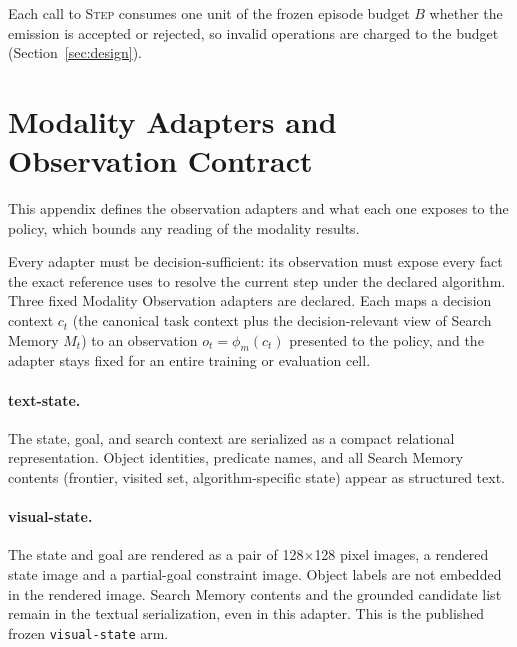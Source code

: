 Each call to \textsc{Step} consumes one unit of the frozen episode budget $B$ whether the emission is accepted or rejected, so invalid operations are charged to the budget (Section~\ref{sec:design}).


\section{Modality Adapters and Observation Contract}
\label{app:modality-adapters}

This appendix defines the observation adapters and what each one exposes to the policy, which bounds any reading of the modality results.

Every adapter must be decision-sufficient: its observation must expose every fact the exact reference uses to resolve the current step under the declared algorithm. Three fixed Modality Observation adapters are declared. Each maps a decision context $c_t$ (the canonical task context plus the decision-relevant view of Search Memory $M_t$) to an observation $o_t = \phi_m(c_t)$ presented to the policy, and the adapter stays fixed for an entire training or evaluation cell.

\paragraph{text-state.}
The state, goal, and search context are serialized as a compact relational representation. Object identities, predicate names, and all Search Memory contents (frontier, visited set, algorithm-specific state) appear as structured text.

\paragraph{visual-state.}
The state and goal are rendered as a pair of 128$\times$128 pixel images, a rendered state image and a partial-goal constraint image. Object labels are not embedded in the rendered image. Search Memory contents and the grounded candidate list remain in the textual serialization, even in this adapter. This is the published frozen \texttt{visual-state} arm.

